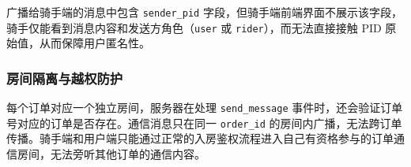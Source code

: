 广播给骑手端的消息中包含 \texttt{sender\_pid} 字段，但骑手端前端界面不展示该字段，骑手仅能看到消息内容和发送方角色（\texttt{user} 或 \texttt{rider}），而无法直接接触 PID 原始值，从而保障用户匿名性。

\subsubsection*{房间隔离与越权防护}

每个订单对应一个独立房间，服务器在处理 \texttt{send\_message} 事件时，还会验证订单号对应的订单是否存在。通信消息只在同一 \texttt{order\_id} 的房间内广播，无法跨订单传播。骑手端和用户端只能通过正常的入房鉴权流程进入自己有资格参与的订单通信房间，无法旁听其他订单的通信内容。
